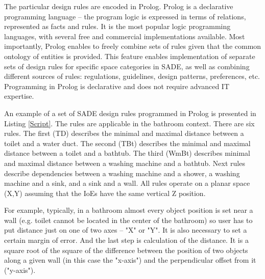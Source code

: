 \documentclass[runningheads]{llncs}
\begin{document}
The particular design rules are encoded in Prolog. Prolog is a declarative programming language -- the program logic is expressed in terms of relations, represented as facts and rules. It is the most popular logic programming languages, with several free and commercial implementations available. Most importantly, Prolog enables to freely combine sets of rules given that the common ontology of entities is provided. This feature enables implementation of separate sets of design rules for specific space categories in SADE, as well as combining different sources of rules: regulations, guidelines, design patterns, preferences, etc. Programming in Prolog is declarative and does not require advanced IT expertise.

An example of a set of SADE design rules programmed in Prolog is presented in Listing \ref{Script}. The rules are applicable in the bathroom context. There are six rules. The first (TD) describes the minimal and maximal distance between a toilet and a water duct. The second (TBt) describes the minimal and maximal distance between a toilet and a bathtub. The third (WmBt) describes minimal and maximal distance between a washing machine and a bathtub. Next rules describe dependencies between a washing machine and a shower, a washing machine and a sink, and a sink and a wall. All rules operate on a planar space (X,Y) assuming that the IoEs have the same vertical Z position.

For example, typically, in a bathroom almost every object position is set near a wall (e.g. toilet cannot be located in the center of the bathroom) so user has to put distance just on one of two axes -- "X" or "Y". It is also necessary to set a certain margin of error. And the last step is calculation of the distance. It is a square root of the square of the difference between the position of two objects along a given wall (in this case the "x-axis") and the perpendicular offset from it ("y-axis").\\

\begin{lstlisting}[language={c++}, caption={Example of design rules in Prolog}, label={Script}]
\end{lstlisting}

\vspace{-15pt}
\end{document}
